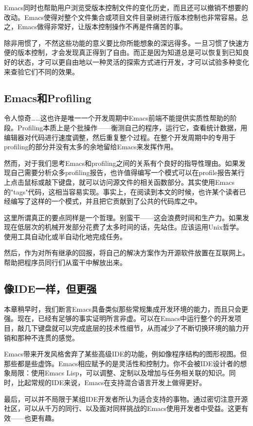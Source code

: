 \documentclass[12pt,oneside]{ctexbook}
\begin{document}
\begin{common-format}
Emacs同时也帮助用户浏览受版本控制文件的变化历史，而且还可以撤销不想要的改动。Emacs使得对整个文件集合或项目文件目录树进行版本控制也非常容易。总之，Emacs做得非常好，让版本控制操作不再是件痛苦的事。

除非用惯了，不然这些功能的意义要比你所能想象的深远得多。一旦习惯了快速方便的版本控制，才会发现真正得到了自由。而正是因为知道总是可以恢复到已知良好的状态，才可以更自由地以一种灵活的探索方式进行开发，才可以试验多种变化来查验它们不同的效果。

\subsection{Emacs和Profiling}
令人惊奇……这也许是唯一一个开发周期中Emacs前端不能提供实质性帮助的阶段。Profiling本质上是个批操作——衡测自己的程序，运行它，查看统计数据，用编辑器对代码进行速度调整，然后重复整个过程。在整个开发周期中的专用于profiling的部分并没有太多的余地留给Emacs来发挥作用。

然而，对于我们思考Emacs和profiling之间的关系有个良好的指导性理由。如果发现自己需要分析众多profiling报告，也许值得编写一个模式可以在profile报告某行上点击鼠标或敲下键盘，就可以访问源文件的相关函数部分。其实使用Emacs的"tags"代码，这相当容易实现。事实上，在阅读到本文的时候，也许某个读者已经编写了这样的一个模式，并且把它贡献到了公共的代码库之中。

这里所谓真正的要点同样是一个哲理。别蛮干——这会浪费时间和生产力。如果发现在低层次的机械开发部分花费了太多时间的话，先站住。应该运用Unix哲学。使用工具自动化或半自动化地完成任务。

然后，作为对所有继承的回报，将自己的解决方案作为开源软件放置在互联网上。帮助把程序员同行们从蛮干中解放出来。


\subsection{像IDE一样，但更强}
本章稍早时，我们断言Emacs具备类似那些常规集成开发环境的能力，而且只会更强。现在，已经有足够的事实证明所言非虚。可以在Emacs中运行整个的开发项目，敲几下键盘就可以完成底层的技术性细节，从而减少了不断切换环境的脑力开销和那种不连贯的感觉。

Emacs带来开发风格舍弃了某些高级IDE的功能，例如像程序结构的图形视图。但那些都是些虚饰。Emacs相应赋予的是灵活性和控制力。你不会被IDE设计者的想象局限：使用Emacs Lisp，可以调整、定制以及增加与任务相关联的知识。同时，比起常规的IDE来说，Emacs在支持混合语言开发上做得更好。

最后，可以并不局限于某组IDE开发者所认为适合支持的事物。通过密切注意开源社区，可以从千万的同行、以及面对同样挑战的Emacs使用开发者中受益。这更有效——也更有趣。





\end{common-format}
\end{document}
